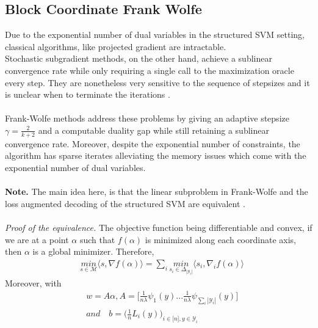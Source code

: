 \documentclass{article}
\begin{document}
\subsection{Block Coordinate Frank Wolfe}
Due to the exponential number of dual variables in the structured SVM setting, classical algorithms, like projected gradient are intractable.
\\
Stochastic subgradient methods, on the other hand, achieve a sublinear convergence rate while only requiring a single call to the maximization oracle every step. They are nonetheless very sensitive to the sequence of stepsizes and it is unclear when to terminate the iterations \cite{Lacoste12}.
\\
\\
Frank-Wolfe methods address these problems by giving an  adaptive stepsize $\gamma= \frac{2}{k+2}$ and a computable duality gap while still retaining a sublinear convergence rate. Moreover, despite the exponential number of constraints, the algorithm has sparse iterates alleviating the memory issues which come with the exponential number of dual variables.\\
\\
\textbf{Note.} The main idea here, is that the linear subproblem in Frank-Wolfe and the loss augmented decoding of the structured SVM are equivalent \cite{Lacoste12}.\\
\\
\textit{Proof of the equivalence.} The objective function being differentiable and convex, if we are at a point $\alpha$ 
such that $f(\alpha)$ is minimized along each coordinate axis, then $\alpha$ is a global minimizer. Therefore,
\begin{equation*}
\begin{aligned}
    &\underset{s\in\mathcal{M}}{\textit{min}}\langle s, \nabla f(\alpha)\rangle = \sum_{i}\underset{s_{i}\in\Delta_{|\mathcal{Y}_{i}|}}{\textit{min}}\langle s_{i}, \nabla_{i} f(\alpha)\rangle
\end{aligned}
\end{equation*}
Moreover, with 
\begin{equation*}
\begin{aligned}
   &w=A\alpha, A=\Big[\frac{1}{n\lambda}\psi_{1}(y)...\frac{1}{n\lambda}\psi_{\sum_{i}|\mathcal{Y}_{i}|}(y)\Big]\\
   &\textit{and}\quad b=\Big(\frac{1}{n}L_{i}(y)\Big)_{i\in\big[n\big],y\in\mathcal{Y}_{i}}
\end{aligned}
\end{equation*} 
\end{document}
